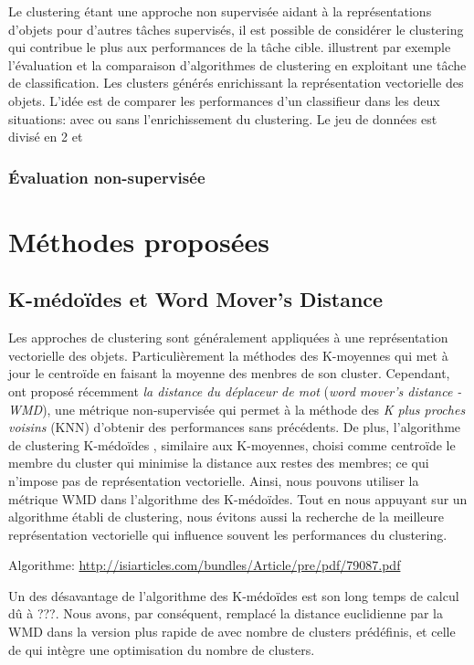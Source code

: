   Le clustering étant une approche non supervisée aidant à la représentations d'objets pour d'autres tâches supervisés, il est possible de considérer le clustering qui contribue le plus aux performances de la tâche cible. \citet{candillier2006clustEvalCascad} illustrent par exemple l'évaluation et la comparaison d'algorithmes de clustering en exploitant une tâche de classification. Les clusters générés enrichissant la représentation vectorielle des objets. L'idée est de comparer les performances d'un classifieur dans les deux situations: avec ou sans l'enrichissement du clustering. Le jeu de données est divisé en 2 et 


\subsubsection{Évaluation non-supervisée}

\section{Méthodes proposées}

\subsection{K-médoïdes et \og Word Mover's Distance \fg}

Les approches de clustering sont généralement appliquées à une représentation vectorielle des objets. Particulièrement la méthodes des K-moyennes qui met à jour le centroïde en faisant la moyenne des menbres de son cluster. Cependant, \cite{kusner2015wordmoverdist} ont proposé récemment \textit{la distance du déplaceur de mot} (\textit{word mover's distance - WMD}), une métrique non-supervisée qui permet à la méthode des \textit{K plus proches voisins} (KNN) d'obtenir des performances sans précédents. De plus, l'algorithme de clustering K-médoïdes \citep{kaufman1987kmedoids}, similaire aux K-moyennes, choisi comme centroïde le membre du cluster qui minimise la distance aux restes des membres; ce qui n'impose pas de représentation vectorielle. Ainsi, nous pouvons utiliser la métrique WMD dans  l'algorithme des K-médoïdes. Tout en nous appuyant sur un algorithme établi de clustering, nous évitons aussi la recherche de la meilleure représentation vectorielle qui influence souvent les performances du clustering. 

Algorithme: \url{http://isiarticles.com/bundles/Article/pre/pdf/79087.pdf}


Un des désavantage de l'algorithme des K-médoïdes est son long temps de calcul dû à ???. Nous avons, par conséquent, remplacé la distance euclidienne par la WMD dans la version plus rapide de \cite{Park2009fastkmedoids} avec nombre de clusters prédéfinis, et celle de \cite{sabzi2011fuzzykmedoids} qui intègre une optimisation du nombre de clusters.

